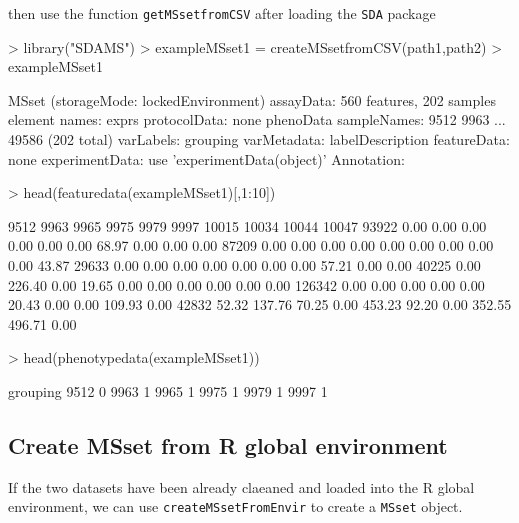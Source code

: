 \documentclass[12pt]{article}
\begin{document}
then use the function {\tt getMSsetfromCSV} after loading the {\tt SDA} package
\begin{Schunk}
\begin{Sinput}
> library("SDAMS")
> exampleMSset1 = createMSsetfromCSV(path1,path2)
> exampleMSset1
\end{Sinput}
\begin{Soutput}
MSset (storageMode: lockedEnvironment)
assayData: 560 features, 202 samples 
  element names: exprs 
protocolData: none
phenoData
  sampleNames: 9512 9963 ... 49586 (202 total)
  varLabels: grouping
  varMetadata: labelDescription
featureData: none
experimentData: use 'experimentData(object)'
Annotation:  
\end{Soutput}
\begin{Sinput}
> head(featuredata(exampleMSset1)[,1:10])
\end{Sinput}
\begin{Soutput}
        9512   9963  9965  9975   9979  9997 10015  10034  10044 10047
93922   0.00   0.00  0.00  0.00   0.00  0.00 68.97   0.00   0.00  0.00
87209   0.00   0.00  0.00  0.00   0.00  0.00  0.00   0.00   0.00 43.87
29633   0.00   0.00  0.00  0.00   0.00  0.00  0.00  57.21   0.00  0.00
40225   0.00 226.40  0.00 19.65   0.00  0.00  0.00   0.00   0.00  0.00
126342  0.00   0.00  0.00  0.00   0.00 20.43  0.00   0.00 109.93  0.00
42832  52.32 137.76 70.25  0.00 453.23 92.20  0.00 352.55 496.71  0.00
\end{Soutput}
\begin{Sinput}
> head(phenotypedata(exampleMSset1))
\end{Sinput}
\begin{Soutput}
     grouping
9512        0
9963        1
9965        1
9975        1
9979        1
9997        1
\end{Soutput}
\end{Schunk}



\subsection{Create MSset from R global environment}
If the two datasets have been already claeaned and loaded into the R global
environment, we can use {\tt createMSsetFromEnvir} to create a {\tt MSset} object.
\end{document}
